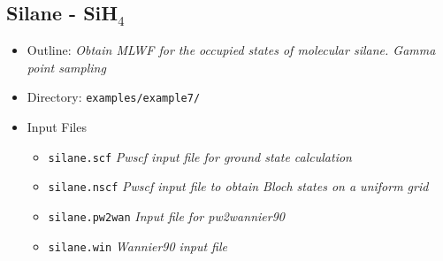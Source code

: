 \documentclass[a4paper,11pt,twoside]{article}
\begin{document}
\subsection*{Silane - SiH$_4$}
\begin{itemize}
\item{Outline: \it{Obtain MLWF for the occupied states of molecular silane. Gamma point sampling}}
\item{Directory: {\tt examples/example7/}}
\item{Input Files}
\begin{itemize}
\item{ {\tt silane.scf}  {\it Pwscf input file for ground state calculation}}
\item{ {\tt silane.nscf}  {\it Pwscf input file to obtain Bloch states on a uniform grid}}
\item{ {\tt silane.pw2wan}  {\it Input file for pw2wannier90}}
\item{ {\tt silane.win}  {\it Wannier90 input file}}
\end{itemize}
                                                                                                                                            
\end{itemize}
\end{document}
